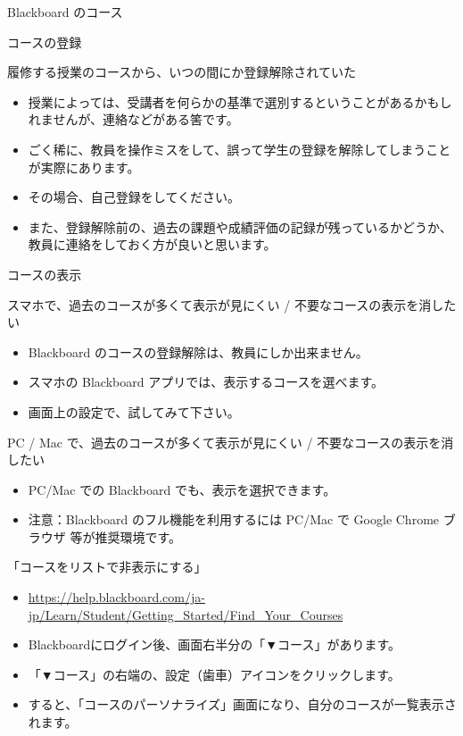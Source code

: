 \documentclass[a4j,10pt]{jsarticle}
\begin{document}
{\begin{frame}[label={sec:org4d8bc57},fragile]{Blackboard のコース}
\begin{block}{コースの登録}
\begin{block}{履修する授業のコースから、いつの間にか登録解除されていた}
\begin{itemize}
\item 授業によっては、受講者を何らかの基準で選別するということがあるかもしれませんが、連絡などがある筈です。
\item ごく稀に、教員を操作ミスをして、誤って学生の登録を解除してしまうことが実際にあります。
\item その場合、自己登録をしてください。
\item また、登録解除前の、過去の課題や成績評価の記録が残っているかどうか、教員に連絡をしておく方が良いと思います。
\end{itemize}
\end{block}
\end{block}
\par
\begin{block}{コースの表示}
\begin{block}{スマホで、過去のコースが多くて表示が見にくい / 不要なコースの表示を消したい}
\begin{itemize}
\item Blackboard のコースの登録解除は、教員にしか出来ません。
\item スマホの Blackboard アプリでは、表示するコースを選べます。
\item 画面上の設定で、試してみて下さい。
\end{itemize}
\end{block}
\par
\begin{block}{PC / Mac で、過去のコースが多くて表示が見にくい / 不要なコースの表示を消したい}
\begin{itemize}
\item PC/Mac での Blackboard でも、表示を選択できます。
\item 注意：Blackboard のフル機能を利用するには PC/Mac で Google Chrome ブラウザ 等が推奨環境です。
\end{itemize}
\par
\begin{block}{「コースをリストで非表示にする」}
\begin{itemize}
\item \url{https://help.blackboard.com/ja-jp/Learn/Student/Getting\_Started/Find\_Your\_Courses}
\par
\item Blackboardにログイン後、画面右半分の「▼コース」があります。
\item 「▼コース」の右端の、設定（歯車）アイコンをクリックします。
\item すると、「コースのパーソナライズ」画面になり、自分のコースが一覧表示されます。

\end{itemize}
\end{block}
\end{block}
\end{block}
\end{frame}}
\end{document}
